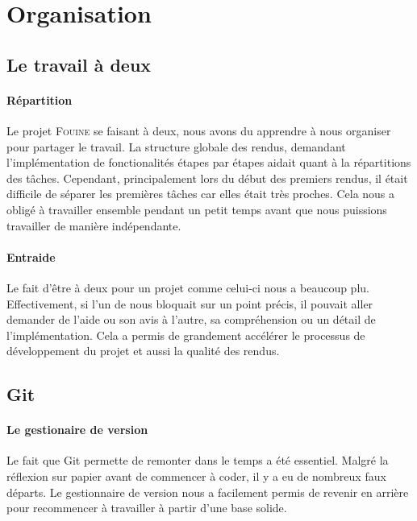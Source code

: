 \documentclass[14pt,a4paper]{extarticle}
\newcommand{\fouine}{\textsc{Fouine }}
\begin{document}
\newpage

\newpage

\section{Organisation}

\subsection{Le travail à deux}

\paragraph{Répartition}
Le projet \fouine  se faisant à deux, nous avons du
apprendre à nous organiser pour partager le travail.
La structure globale des rendus, demandant l'implémentation
de fonctionalités étapes par étapes aidait quant à la
répartitions des tâches. Cependant, principalement lors
du début des premiers rendus, il était difficile de
séparer les premières tâches car elles était très proches.
Cela nous a obligé à travailler ensemble pendant un petit
temps avant que nous puissions travailler de manière indépendante.

\paragraph{Entraide}
Le fait d'être à deux pour un projet comme celui-ci nous a
beaucoup plu. Effectivement, si l'un de nous bloquait sur
un point précis, il pouvait aller demander de l'aide ou son
avis à l'autre, sa compréhension ou un détail de l'implémentation.
Cela a permis de grandement accélérer le processus de développement
du projet et aussi la qualité des rendus.

\subsection{Git}

\paragraph{Le gestionaire de version}
Le fait que Git permette de remonter dans le
temps a été essentiel. Malgré la réflexion sur papier
avant de commencer à coder, il y a eu de nombreux faux
départs. Le gestionnaire de version nous a facilement
permis de revenir en arrière pour recommencer à travailler
à partir d'une base solide.\\[1cm]
\end{document}
